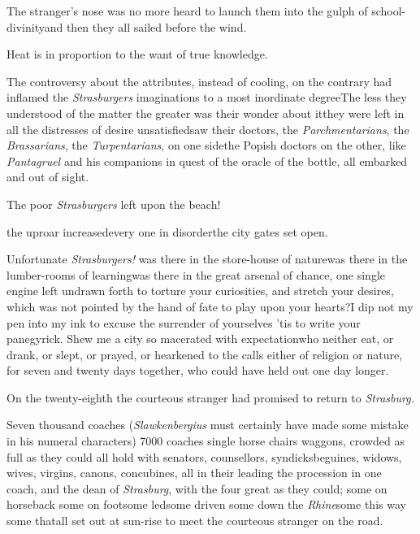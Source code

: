 \documentclass{article}
\begin{document}
The stranger’s nose was no more heard 
to launch them into the gulph of school-divinity\tsk and then they all
sailed before the wind.

Heat is in proportion to the want of true knowledge.

The controversy about the attributes, \etc instead of
cooling, on the contrary had inflamed the \textit{Strasburgers}
imaginations to a most inordinate degree\tsk The less they
understood of the matter the greater was their wonder about
it\tsk they were left in all the distresses of desire
unsatisfied\tsh saw their doctors, the
\textit{Parchmentarians}, the \textit{Brassarians}, the
\textit{Turpentarians}, on one side\tsk the Popish
doctors
on the other, like \textit{Pantagruel} and his companions in
quest of the oracle of the bottle, all embarked and out of
sight.

\tsh The poor \textit{Strasburgers} left upon the
beach!

\noindent
{}\break
\tsk the uproar
increased\tsk every one in disorder\tsk the city gates set
open.\tsk

Unfortunate \textit{Strasburgers!} was there in the
store-house of nature\tsk was there in the lumber-rooms of
learning\tsk was there in the great arsenal of chance, one
single engine left undrawn forth to torture your
curiosities, and stretch your desires, which was not pointed
by the hand of fate to play upon your hearts?\tsk I dip not
my pen into my ink to excuse the surrender of yourselves\tsk
’tis to write your panegyrick. Shew me a city so macerated
with expectation\tsh who neither eat, or drank, or slept, or
prayed, or hearkened to the calls either of religion or
nature, for seven and twenty days together, who could have
held out one day longer.

On the twenty-eighth the courteous stranger had promised to
return to \textit{Strasburg.}

Seven thousand coaches (\textit{Slawkenber\-gius} must certainly have made some
mistake in his numeral characters) 7000\break
coaches single horse chairs\tsh{} waggons, crowded as full as they could all hold with senators, counsellors, 
syndicks\tsk beguines, widows, wives, virgins, canons,
concubines, all in their\break
{}
leading the procession in one coach, and the dean of \textit{Strasburg}, with the
four great \break
{}
as they could; some on horseback\tsh 
some on foot\tsk some led\tsk some driven\tsk
some down the \textit{Rhine}\tsk some this way\tsk
some that\tsk all set out at sun-rise to meet 
the courteous stranger on the road.
\end{document}
